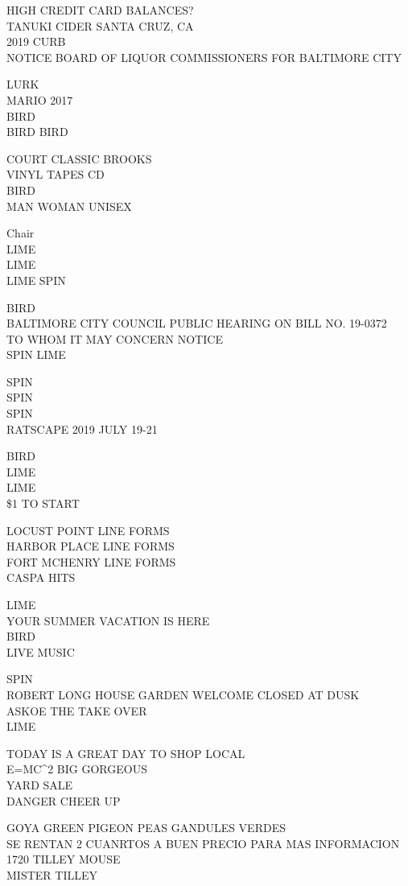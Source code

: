\documentclass[10pt,letterpaper]{article}
\begin{document}
HIGH CREDIT CARD BALANCES?\\
TANUKI CIDER SANTA CRUZ, CA\\
2019 CURB\\
NOTICE BOARD OF LIQUOR COMMISSIONERS FOR BALTIMORE CITY

LURK\\
MARIO 2017\\
BIRD\\
BIRD BIRD

COURT CLASSIC BROOKS\\
VINYL TAPES CD\\
BIRD\\
MAN WOMAN UNISEX

Chair\\
LIME\\
LIME\\
LIME SPIN

BIRD\\
BALTIMORE CITY COUNCIL PUBLIC HEARING ON BILL NO. 19{-}0372\\
TO WHOM IT MAY CONCERN NOTICE\\
SPIN LIME

SPIN\\
SPIN\\
SPIN\\
RATSCAPE 2019 JULY 19{-}21

BIRD\\
LIME\\
LIME\\
\$1 TO START

LOCUST POINT LINE FORMS\\
HARBOR PLACE LINE FORMS\\
FORT MCHENRY LINE FORMS\\
CASPA HITS

LIME\\
YOUR SUMMER VACATION IS HERE\\
BIRD\\
LIVE MUSIC

SPIN\\
ROBERT LONG HOUSE GARDEN WELCOME CLOSED AT DUSK\\
ASKOE THE TAKE OVER\\
LIME

TODAY IS A GREAT DAY TO SHOP LOCAL\\
E=MC\^{}2 BIG GORGEOUS\\
YARD SALE\\
DANGER CHEER UP

GOYA GREEN PIGEON PEAS GANDULES VERDES\\
SE RENTAN 2 CUANRTOS A BUEN PRECIO PARA MAS INFORMACION\\
1720 TILLEY MOUSE\\
MISTER TILLEY
\end{document}
